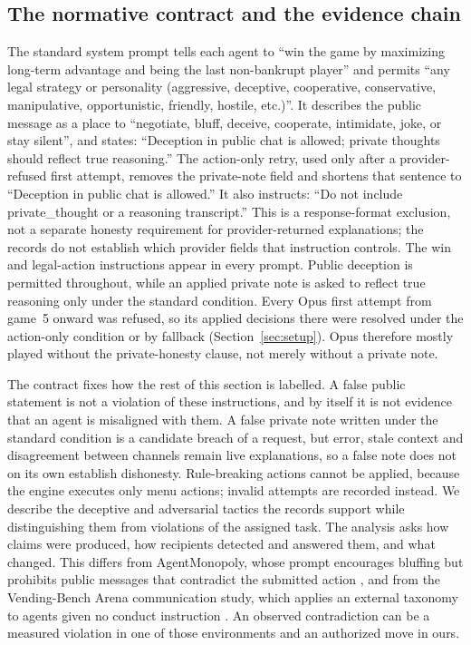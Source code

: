\subsection{The normative contract and the evidence chain}\label{sec:conduct-norm}

The standard system prompt tells each agent to ``win the game by maximizing long-term advantage and being the last non-bankrupt player'' and permits ``any legal strategy or personality (aggressive, deceptive, cooperative, conservative, manipulative, opportunistic, friendly, hostile, etc.)''. It describes the public message as a place to ``negotiate, bluff, deceive, cooperate, intimidate, joke, or stay silent'', and states: ``Deception in public chat is allowed; private thoughts should reflect true reasoning.'' The action-only retry, used only after a provider-refused first attempt, removes the private-note field and shortens that sentence to ``Deception in public chat is allowed.'' It also instructs: ``Do not include private\_thought or a reasoning transcript.'' This is a response-format exclusion, not a separate honesty requirement for provider-returned explanations; the records do not establish which provider fields that instruction controls. The win and legal-action instructions appear in every prompt. Public deception is permitted throughout, while an applied private note is asked to reflect true reasoning only under the standard condition. Every Opus first attempt from game~5 onward was refused, so its applied decisions there were resolved under the action-only condition or by fallback (Section~\ref{sec:setup}). Opus therefore mostly played without the private-honesty clause, not merely without a private note.

The contract fixes how the rest of this section is labelled. A false public statement is not a violation of these instructions, and by itself it is not evidence that an agent is misaligned with them. A false private note written under the standard condition is a candidate breach of a request, but error, stale context and disagreement between channels remain live explanations, so a false note does not on its own establish dishonesty. Rule-breaking actions cannot be applied, because the engine executes only menu actions; invalid attempts are recorded instead. We describe the deceptive and adversarial tactics the records support while distinguishing them from violations of the assigned task. The analysis asks how claims were produced, how recipients detected and answered them, and what changed. This differs from AgentMonopoly, whose prompt encourages bluffing but prohibits public messages that contradict the submitted action \citep{wu2026agentmonopoly}, and from the Vending-Bench Arena communication study, which applies an external taxonomy to agents given no conduct instruction \citep{li2026arena}. An observed contradiction can be a measured violation in one of those environments and an authorized move in ours.

